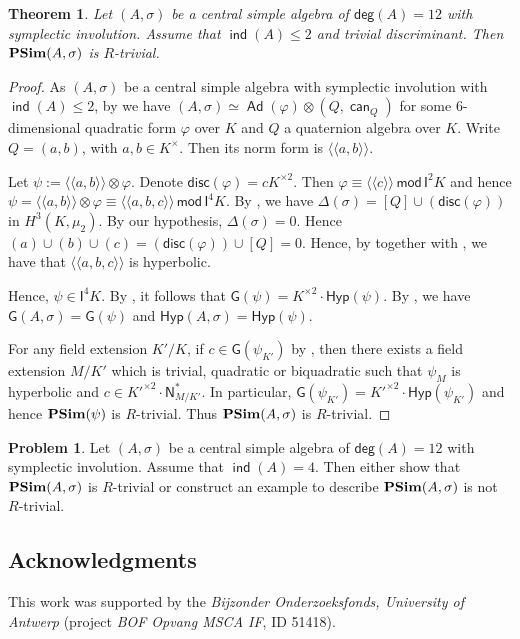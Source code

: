 \documentclass[twoside,11pt]{amsart}
\numberwithin{equation}{section}
\newtheorem{thm}[equation]{Theorem}
\theoremstyle{definition}
\newtheorem{pb}[equation]{Problem}
\renewcommand{\deg}{\operatorname{\mathsf{deg}}}
\newcommand\ind{\operatorname{\mathsf{ind}}}
\newcommand\N{\operatorname{N}}
\newcommand{\can}{\operatorname{\mathsf{can}}}
\newcommand{\vf}{\varphi}
\newcommand{\mg}[1]{{#1}^{\times}}
\newcommand{\sq}[1]{{#1}^{\times 2}}
\newcommand{\s}{\sigma}
\renewcommand{\mod}{\,\mathsf{mod}\,}
\newcommand{\la}{\langle}
\newcommand{\ra}{\rangle}
\newcommand{\lla}{\la\!\la}
\newcommand{\rra}{\ra\!\ra}
\renewcommand{\leq}{\leqslant}
\newcommand\Ad{\operatorname{\mathsf{Ad}}}
\newcommand{\I}{\mathsf{I}}
\renewcommand{\N}{\mathsf{N}}
\newcommand{\disc}{\mathsf{disc}}
\newcommand{\G}{\mathsf{G}}
\newcommand{\Hyp}{\mathsf{Hyp}}
\renewcommand{\deg}{\mathsf{deg}}
\renewcommand{\leq}{\leqslant}
\begin{document}
\begin{thm}\label{6}
    Let $(A,\s)$ be a central simple algebra of $\deg(A)=12$ with symplectic involution. Assume that $\ind(A)\leq 2$ and trivial discriminant. Then  ${\bf PSim}(A,\s)$ is $R$-trivial.
\end{thm}
\begin{proof}
     As $(A,\s)$ be a central simple algebra with symplectic involution with $\ind(A)\leq 2$, by \cite[Prop. 3.4]{BU18} we have $(A,\s)\simeq \Ad(\vf)\otimes (Q,\can_Q)$ for some $6$-dimensional quadratic form $\vf$ over $K$ and $Q$ a quaternion algebra over $K$. 
     Write $Q=(a,b)$, with $a,b\in\mg{K}$. Then its norm form is $\lla a,b\rra$.
 
Let $\psi:=\lla a, b \rra \otimes \vf$.
Denote $\disc(\vf)=c\sq{K}$. 
Then $\vf \equiv \lla c \rra \mod \I^2K$ and hence $\psi=\lla a, b\rra \otimes \vf \equiv \lla a, b ,c\rra \mod \I^4K$. 
By \cite[Main Theorem]{ST04}, we have $\Delta(\s)=[Q]\cup(\disc(\vf))$ in $H^3(K,\mu_2)$.
By our hypothesis, $\Delta(\s)=0$.
Hence 
$(a)\cup(b)\cup (c)=(\disc(\vf))\cup[Q]=0$.   
Hence, by \cite[Theorem 5.1]{MS91} together with \cite[Theorem 4.1]{Mil70}, we have that $\lla a,b,c\rra$ is hyperbolic.

 
 
Hence, $\psi\in \I^4K$. 
By , it follows that $\G(\psi)=\sq{K}\cdot\Hyp(\psi)$. 
By , we have $\G(A,\s)=\G(\psi)$ and $\Hyp(A,\s)=\Hyp(\psi)$. 

 For any field extension $K'/K$, if $c\in \G(\psi_{K'})$ by , then there exists a field extension $M/K'$ which is trivial, quadratic or biquadratic such that $\psi_M$ is hyperbolic and $c\in\sq{K'}\cdot \N_{M/K'}^\ast$. In particular, $\G(\psi_{K'})=\sq{K'}\cdot\Hyp(\psi_{K'})$ and hence ${\bf PSim}(\psi)$ is $R$-trivial. Thus ${\bf PSim}(A,\s)$ is $R$-trivial.
\end{proof}

\begin{pb}
    Let $(A,\s)$ be a central simple algebra of $\deg(A)=12$ with symplectic involution. Assume that $\ind(A) = 4$. Then either show that ${\bf PSim}(A,\s)$ is $R$-trivial or construct an example to describe ${\bf PSim}(A,\s)$ is not $R$-trivial.
\end{pb}


\subsection*{Acknowledgments}
This work was supported by the \emph{Bijzonder Onderzoeksfonds, University of Antwerp} (project \emph{BOF Opvang MSCA IF}, ID 51418).
\end{document}
